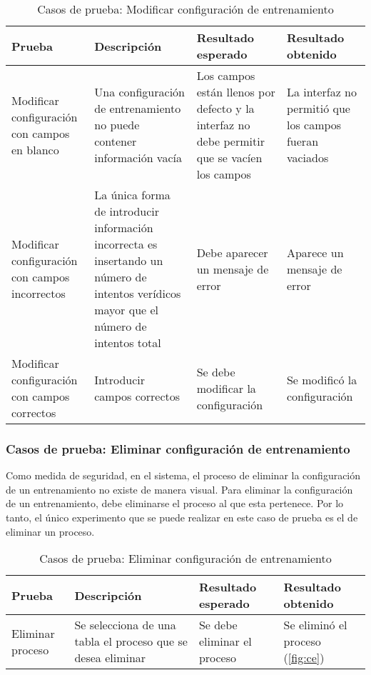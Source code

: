 \begin{table}[H]
\begin{center}
\begin{tabular}{ | p{4cm} | p{4cm} | p{3.1cm} | p{3cm} |}
\hline
\centering\textbf{Prueba} & \textbf{Descripción} & \textbf{Resultado \break esperado} & \textbf{Resultado \break obtenido} \\
\hline
Modificar configuración con campos en blanco & Una configuración de entrenamiento no puede contener información vacía & Los campos están llenos por defecto y la interfaz no debe permitir que se vacíen los campos & La interfaz no permitió que los campos fueran vaciados \\
\hline
Modificar configuración con campos incorrectos & La única forma de introducir información incorrecta es insertando un número de intentos verídicos mayor que el número de intentos total & Debe aparecer un mensaje de error & Aparece un mensaje de error \\
\hline
Modificar configuración con campos correctos & Introducir campos correctos & Se debe modificar la configuración  & Se modificó la configuración \\
\hline
\end{tabular}
\caption{Casos de prueba: Modificar configuración de entrenamiento}
\label{cas2}
\end{center}
\end{table}

\subsubsection{Casos de prueba: Eliminar configuración de entrenamiento}
Como medida de seguridad, en el sistema, el proceso de eliminar la configuración de un entrenamiento no existe de manera visual. Para eliminar la configuración de un entrenamiento, debe eliminarse el proceso al que esta pertenece. Por lo tanto, el único experimento que se puede realizar en este caso de prueba es el de eliminar un proceso.

\begin{table}[H]
\begin{center}
\begin{tabular}{ | p{3.3cm} | p{5.2cm} | p{3.1cm} | p{2.5cm} |}
\hline
\centering\textbf{Prueba} & \textbf{Descripción} & \textbf{Resultado \break esperado} & \textbf{Resultado \break obtenido} \\
\hline
Eliminar proceso & Se selecciona de una tabla el proceso que se desea eliminar & Se debe eliminar el proceso & Se eliminó el proceso (\ref{fig:ce}) \\
\hline
\end{tabular}
\caption{Casos de prueba: Eliminar configuración de entrenamiento}
\label{cas3}
\end{center}
\end{table}

